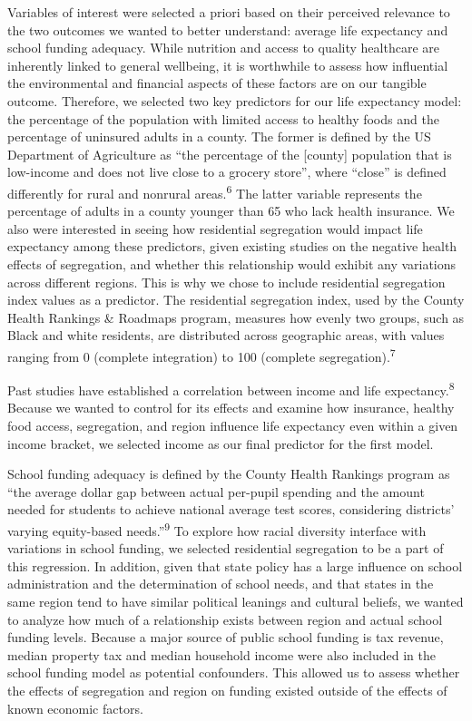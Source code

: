 \documentclass[
  10pt,
  letterpaper,
  DIV=11,
  numbers=noendperiod]{scrartcl}
\begin{document}
Variables of interest were selected a priori based on their perceived
relevance to the two outcomes we wanted to better understand: average
life expectancy and school funding adequacy. While nutrition and access
to quality healthcare are inherently linked to general wellbeing, it is
worthwhile to assess how influential the environmental and financial
aspects of these factors are on our tangible outcome. Therefore, we
selected two key predictors for our life expectancy model: the
percentage of the population with limited access to healthy foods and
the percentage of uninsured adults in a county. The former is defined by
the US Department of Agriculture as ``the percentage of the {[}county{]}
population that is low-income and does not live close to a grocery
store'', where ``close'' is defined differently for rural and nonrural
areas.\textsuperscript{6} The latter variable represents the percentage
of adults in a county younger than 65 who lack health insurance. We also
were interested in seeing how residential segregation would impact life
expectancy among these predictors, given existing studies on the
negative health effects of segregation, and whether this relationship
would exhibit any variations across different regions. This is why we
chose to include residential segregation index values as a predictor.
The residential segregation index, used by the County Health Rankings \&
Roadmaps program, measures how evenly two groups, such as Black and
white residents, are distributed across geographic areas, with values
ranging from 0 (complete integration) to 100 (complete
segregation).\textsuperscript{7}~

Past studies have established a correlation between income and life
expectancy.\textsuperscript{8} Because we wanted to control for its
effects and examine how insurance, healthy food access, segregation, and
region influence life expectancy even within a given income bracket, we
selected income as our final predictor for the first model.

School funding adequacy is defined by the County Health Rankings program
as ``the average dollar gap between actual per-pupil spending and the
amount needed for students to achieve national average test scores,
considering districts' varying equity-based needs.''\textsuperscript{9}
To explore how racial diversity interface with variations in school
funding, we selected residential segregation to be a part of this
regression. In addition, given that state policy has a large influence
on school administration and the determination of school needs, and that
states in the same region tend to have similar political leanings and
cultural beliefs, we wanted to analyze how much of a relationship exists
between region and actual school funding levels. Because a major source
of public school funding is tax revenue, median property tax and median
household income were also included in the school funding model as
potential confounders. This allowed us to assess whether the effects of
segregation and region on funding existed outside of the effects of
known economic factors.
\end{document}

